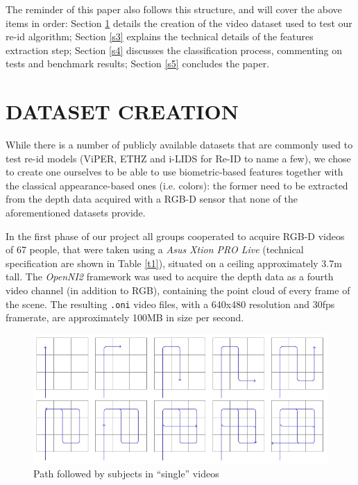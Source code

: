 \documentclass[letterpaper, 11pt, conference]{ieeeconf} %
\begin{document}
The reminder of this paper also follows this structure, and will cover the above items in order: Section \ref{s1} details the creation of the video dataset used to test our re-id algorithm; Section \ref{s3} explains the technical details of the features extraction step; Section \ref{s4} discusses the classification process, commenting on tests and benchmark results; Section \ref{s5} concludes the paper.

\section{DATASET CREATION} \label{s1}
While there is a number of publicly available datasets that are commonly used to test re-id models (ViPER\cite{c2}, ETHZ\cite{c3} and i-LIDS for Re-ID\cite{c4} to name a few), we chose to create one ourselves to be able to use biometric-based features together with the classical appearance-based ones (i.e. colors): the former need to be extracted from the depth data acquired with a RGB-D sensor that none of the aforementioned datasets provide.

In the first phase of our project all groups cooperated to acquire RGB-D videos of 67 people, that were taken using a \emph{Asus Xtion PRO Live} (technical specification are shown in Table \ref{t1}), situated on a ceiling approximately 3.7m tall. The \emph{OpenNI2}\cite{c5} framework was used to acquire the depth data as a fourth video channel (in addition to RGB), containing the point cloud of every frame of the scene. The resulting \texttt{.oni} video files, with a 640x480 resolution and 30fps framerate, are approximately 100MB in size per second.

\begin{figure}[b] %
\centering
\includegraphics[width=\textwidth]{Percorso.jpg}
\caption{Path followed by subjects in ``single'' videos} \label{f2}
\end{figure}
\end{document}
